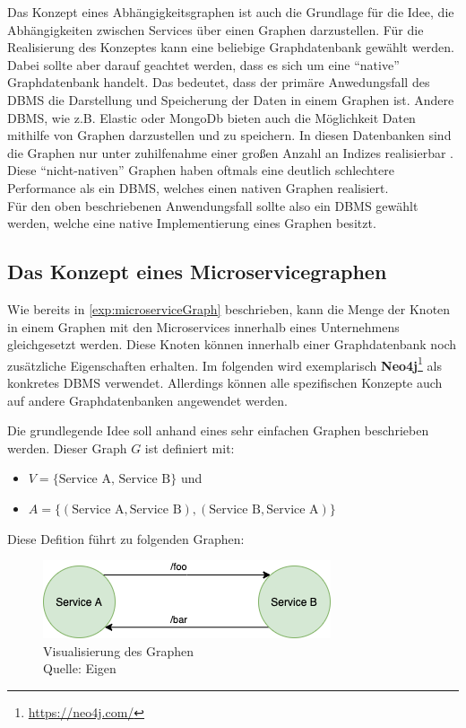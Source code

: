 \documentclass[
	12pt,
	BCOR=5mm,
	DIV=12,
	headinclude=on,
	footinclude=off,
	parskip=half,
	bibliography=totoc,
	listof=entryprefix,
	toc=listof,
	numbers=noenddot,
	plainfootsepline
]{scrreprt}
\begin{document}
Das Konzept eines Abhängigkeitsgraphen ist auch die Grundlage für die Idee, die Abhängigkeiten zwischen Services über einen Graphen darzustellen. Für die Realisierung des Konzeptes kann eine beliebige Graphdatenbank gewählt werden. Dabei sollte aber darauf geachtet werden, dass es sich um eine \enquote{native} Graphdatenbank handelt. Das bedeutet, dass der primäre Anwedungsfall des \ac{DBMS} die Darstellung und Speicherung der Daten in einem Graphen ist. Andere \ac{DBMS}, wie z.B. Elastic oder MongoDb bieten auch die Möglichkeit Daten mithilfe von Graphen darzustellen und zu speichern. In diesen Datenbanken sind die Graphen nur unter zuhilfenahme einer großen Anzahl an Indizes realisierbar \autocite{JoyChao2016}. Diese \enquote{nicht-nativen} Graphen haben oftmals eine deutlich schlechtere Performance als ein \ac{DBMS}, welches einen nativen Graphen realisiert.\\
Für den oben beschriebenen Anwendungsfall sollte also ein \ac{DBMS} gewählt werden, welche eine native Implementierung eines Graphen besitzt.

\subsection{Das Konzept eines Microservicegraphen}

Wie bereits in \vref{exp:microserviceGraph} beschrieben, kann die Menge der Knoten in einem Graphen mit den Microservices innerhalb eines Unternehmens gleichgesetzt werden. Diese Knoten können innerhalb einer Graphdatenbank noch zusätzliche Eigenschaften erhalten. Im folgenden wird exemplarisch \textbf{Neo4j}\footnote{\url{https://neo4j.com/}} als konkretes \ac{DBMS} verwendet. Allerdings können alle spezifischen Konzepte auch auf andere Graphdatenbanken angewendet werden.

Die grundlegende Idee soll anhand eines sehr einfachen Graphen beschrieben werden. Dieser Graph $G$ ist definiert mit:
\begin{itemize}
	\item $V = \{\text{Service A, Service B}\}$ und
	\item $A = \{(\text{Service A},\text{Service B}), (\text{Service B}, \text{Service A})\}$
\end{itemize}

Diese Defition führt zu folgenden Graphen:

\begin{figure}[h]
	\centering
	\includegraphics[width=0.65\linewidth]{img/service_dependencies.png}
	\caption[Abbildung eines simplen Abhängigkeitsgraphen]{Visualisierung des Graphen\\Quelle: Eigen}
\end{figure}
\end{document}
